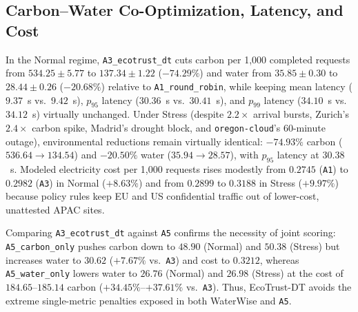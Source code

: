 \documentclass[conference]{IEEEtran}
\begin{document}
\subsection{Carbon--Water Co-Optimization, Latency, and Cost}
In the Normal regime, \texttt{A3\_ecotrust\_dt} cuts carbon per 1,000 completed requests from $534.25 \pm 5.77$ to $137.34 \pm 1.22$ ($-74.29\%$) and water from $35.85 \pm 0.30$ to $28.44 \pm 0.26$ ($-20.68\%$) relative to \texttt{A1\_round\_robin}, while keeping mean latency ($9.37$~s vs.\ $9.42$~s), $p_{95}$ latency ($30.36$~s vs.\ $30.41$~s), and $p_{99}$ latency ($34.10$~s vs.\ $34.12$~s) virtually unchanged. Under Stress (despite $2.2\times$ arrival bursts, Zurich's $2.4\times$ carbon spike, Madrid's drought block, and \texttt{oregon-cloud}'s 60-minute outage), environmental reductions remain virtually identical: $-74.93\%$ carbon ($536.64 \rightarrow 134.54$) and $-20.50\%$ water ($35.94 \rightarrow 28.57$), with $p_{95}$ latency at $30.38$~s. Modeled electricity cost per 1,000 requests rises modestly from $0.2745$ (\texttt{A1}) to $0.2982$ (\texttt{A3}) in Normal ($+8.63\%$) and from $0.2899$ to $0.3188$ in Stress ($+9.97\%$) because policy rules keep EU and US confidential traffic out of lower-cost, unattested APAC sites.

Comparing \texttt{A3\_ecotrust\_dt} against \texttt{A5} confirms the necessity of joint scoring: \texttt{A5\_carbon\_only} pushes carbon down to $48.90$ (Normal) and $50.38$ (Stress) but increases water to $30.62$ ($+7.67\%$ vs.\ \texttt{A3}) and cost to $0.3212$, whereas \texttt{A5\_water\_only} lowers water to $26.76$ (Normal) and $26.98$ (Stress) at the cost of $184.65$--$185.14$ carbon ($+34.45\%$--$+37.61\%$ vs.\ \texttt{A3}). Thus, EcoTrust-DT avoids the extreme single-metric penalties exposed in both WaterWise and \texttt{A5}.
\end{document}
